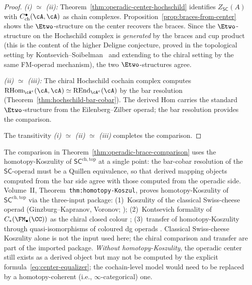 \begin{proof}
\emph{(i) $\simeq$ (ii):}
Theorem~\ref{thm:operadic-center-hochschild} identifies
$Z_{\mathsf{SC}}(A)$ with $C^{\bullet}_{\mathrm{ch}}(\cA, \cA)$
as chain complexes. Proposition~\ref{prop:braces-from-center}
shows the $\Etwo$-structure on the center recovers the braces.
Since the $\Etwo$-structure on the Hochschild complex is
\emph{generated} by the braces and cup product (this is the content
of the higher Deligne conjecture, proved in the topological setting
by Kontsevich--Soibelman~\cite{KS00} and extending to the chiral
setting by the same FM-operad mechanism), the two $\Etwo$-structures
agree.

\emph{(ii) $\simeq$ (iii):} The chiral Hochschild cochain complex
computes
$\operatorname{RHom}_{\cA^e}(\cA, \cA)
\simeq \operatorname{REnd}_{\cA^e}(\cA)$
by the bar resolution
(Theorem~\ref{thm:hochschild-bar-cobar}). The derived Hom
carries the standard $\Etwo$-structure from the Eilenberg--Zilber
operad; the bar resolution provides the comparison.

The transitivity \emph{(i) $\simeq$ (ii) $\simeq$ (iii)} completes
the comparison.
\end{proof}

\begin{remark}
\label{rem:homotopy-koszulity-center}
The comparison in
Theorem~\ref{thm:operadic-brace-comparison}
uses the homotopy-Koszulity of
$\mathsf{SC}^{\mathrm{ch,top}}$ at a single point: the
bar-cobar resolution of the $\mathsf{SC}$-operad must be a
Quillen equivalence, so that derived mapping objects computed
from the bar side agree with those computed from the operadic side.
Volume~II, Theorem~\texttt{thm:homotopy-Koszul}, proves
homotopy-Koszulity of $\mathsf{SC}^{\mathrm{ch,top}}$ via the
three-input package: \textup{(1)}~Koszulity of the classical
Swiss-cheese operad \textup{(}Ginzburg--Kapranov,
Voronov; \cite{GK94,Voronov99}\textup{)};
\textup{(2)}~Kontsevich formality of
$C_*(\FM_\bullet(\CC))$ as the chiral closed colour
\cite{Kon03}; \textup{(3)}~transfer of homotopy-Koszulity
through quasi-isomorphisms of coloured dg operads
\cite{Val07}. Classical Swiss-cheese Koszulity alone is not the
input used here; the chiral comparison and transfer are part of
the imported package.
\emph{Without homotopy-Koszulity}, the operadic center still
exists as a derived object but may not be computed by the explicit
formula~\eqref{eq:center-equalizer}; the cochain-level model
would need to be replaced by a homotopy-coherent (i.e.,
$\infty$-categorical) one.
\end{remark}


